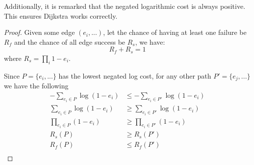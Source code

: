 \documentclass[a4paper,10pt,twoside]{article}
\newtheorem{proof}{Proof}
\begin{document}
Additionally, it is remarked that the negated logarithmic cost is always
positive. This ensures Dijkstra works correctly.

\begin{proof}
	Given some edge $(e_i,...)$, let the chance of having at least one failure
	be $R_f$ and the chance of all edge success be $R_s$, we have:
	\[
	 	R_f + R_s = 1
	 \] 
	 where $R_s = \prod_i{1-e_i}$.

	 Since $P = \{e_i,...\}$ has the lowest negated log cost, for any 
	 other path $P' = \{e_j,...\}$
	 we have the following
	 \[
	 	\begin{aligned}
	 		- \sum_{e_i \in P}{\log{(1 - e_i)}} &\leq - \sum_{e_i \in P'}{\log{(1 - e_i)}} \\
	 		\sum_{e_i \in P}{\log{(1 - e_i)}} &\geq \sum_{e_i \in P'}{\log{(1 - e_i)}} \\
	 		\prod_{e_i \in P}{(1 - e_i)} &\geq \prod_{e_i \in P'}{(1 - e_i)} \\
	 		R_s(P) & \geq R_s(P') \\
	 		R_f(P) & \leq R_f(P') \\
	 	\end{aligned}
	 \]
\end{proof}
\end{document}
